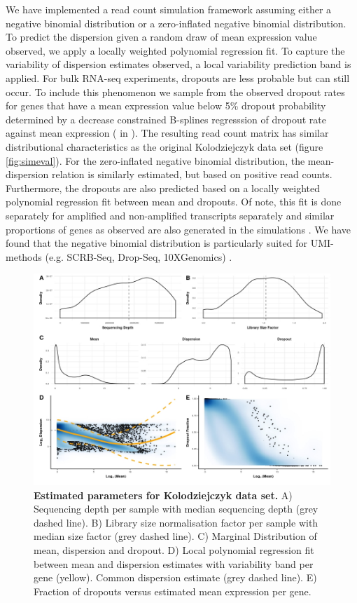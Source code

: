 \documentclass{article}\usepackage[]{graphicx}\usepackage[usenames,dvipsnames]{color}
\begin{document}
We have implemented a read count simulation framework assuming either a negative binomial distribution or a zero-inflated negative binomial distribution.
To predict the dispersion given a random draw of mean expression value observed, we apply a locally weighted polynomial regression fit. To capture the variability of dispersion estimates observed, a local variability prediction band is applied.
For bulk RNA-seq experiments, dropouts are less probable but can still occur. To include this phenomenon we sample from the observed dropout rates for genes that have a mean expression value below 5\% dropout probability determined by a decrease constrained B-splines regresssion of dropout rate against mean expression ( in ).
The resulting read count matrix has similar distributional characteristics as the original Kolodziejczyk data set (figure \ref{fig:simeval}).
For the zero-inflated negative binomial distribution, the mean-dispersion relation is similarly estimated, but based on positive read counts. Furthermore, the dropouts are also predicted based on a locally weighted polynomial regression fit between mean and dropouts. Of note, this fit is done separately for amplified and non-amplified transcripts separately and similar proportions of genes as observed are also generated in the simulations \cite{Ziegenhain2017-sf}.
We have found that the negative binomial distribution is particularly suited for UMI-methods (e.g. SCRB-Seq, Drop-Seq, 10XGenomics) \cite{Vieth2017-su}.


\begin{figure}[h]
\centering
\includegraphics[width=0.75\linewidth]{NBparams.jpeg}
\caption{\textbf{Estimated parameters for Kolodziejczyk data set.} A) Sequencing depth per sample with median sequencing depth (grey dashed line). B) Library size normalisation factor per sample with median size factor (grey dashed line). C) Marginal Distribution of mean, dispersion and dropout. D) Local polynomial regression fit between mean and dispersion estimates with variability band per gene (yellow). Common dispersion estimate (grey dashed line). E) Fraction of dropouts versus estimated mean expression per gene.}
\label{fig:NBparams}
\end{figure}
\end{document}
